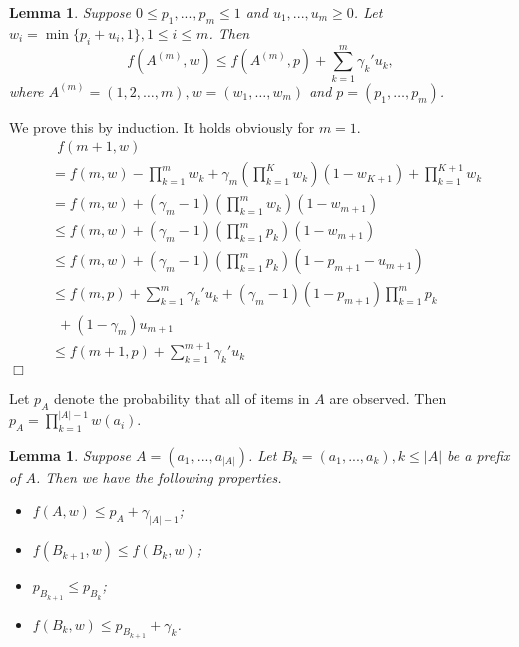 \documentclass{article}
\newcommand{\abs}[1]{\left| #1 \right|}
\newtheorem{lemma}[theorem]{Lemma}%
\newenvironment{proof}{\noindent {\textbf{Proof. }}}{$\Box$ \medskip}
\begin{document}
\begin{lemma}
\label{lem:estimateTech}
Suppose $0 \leq p_1,...,p_m \leq 1$ and $u_1,...,u_m \geq 0$. Let $w_i = \min\{p_i + u_i, 1\}, 1 \leq i \leq m$. Then
$$
f(A^{(m)}, w) \leq f(A^{(m)}, p) + \sum_{k=1}^{m} \gamma_k' u_k,
$$
where $A^{(m)} = (1,2,\ldots,m), w = (w_1, \ldots, w_m)$ and $p = (p_1, \ldots, p_m)$.
\end{lemma}
\begin{proof}
We prove this by induction. It holds obviously for $m=1$.
\begin{align*}
&~~f(m+1, w)\\
&= f(m, w) -\prod_{k=1}^{m} w_k + \gamma_{m}  (\prod_{k=1}^{K} w_k) (1 - w_{K+1})+ \prod_{k=1}^{K+1} w_k\\
&= f(m, w) + (\gamma_{m} - 1) (\prod_{k=1}^{m} w_k) (1 - w_{m+1})\\
&\leq f(m, w) + (\gamma_{m} - 1) (\prod_{k=1}^{m} p_k) (1 - w_{m+1})\\
&\leq f(m, w) + (\gamma_{m} - 1) (\prod_{k=1}^{m} p_k)  (1 - p_{m+1} - u_{m+1})\\
&\leq f(m, p) +  \sum_{k=1}^{m} \gamma_k' u_k + (\gamma_{m} - 1) (1 - p_{m+1}) \prod_{k=1}^{m} p_k\\
&~~ + (1 - \gamma_{m}) u_{m+1}\\
&\leq f(m+1, p) + \sum_{k=1}^{m+1} \gamma_k' u_k
\end{align*}
\end{proof}
	
Let $p_A$ denote the probability that all of items in $A$ are observed. Then $p_A = \prod_{k=1}^{\abs{A}-1}w(a_i)$.

\begin{lemma}
Suppose $A = (a_1, ..., a_{\abs{A}})$. Let $B_k = (a_1, ..., a_k), k \leq \abs{A}$ be a prefix of $A$. Then we have the following properties.
\begin{itemize}
\item[(1)] $f(A, w) \leq p_A + \gamma_{\abs{A} - 1}$;
\item[(2)] $f(B_{k+1}, w) \leq f(B_k, w)$;
\item[(3)] $p_{B_{k+1}} \leq p_{B_k}$;
\item[(4)] $f(B_k, w) \leq p_{B_{k+1}} + \gamma_{k}$.
\end{itemize}	
\end{lemma}
\end{document}
